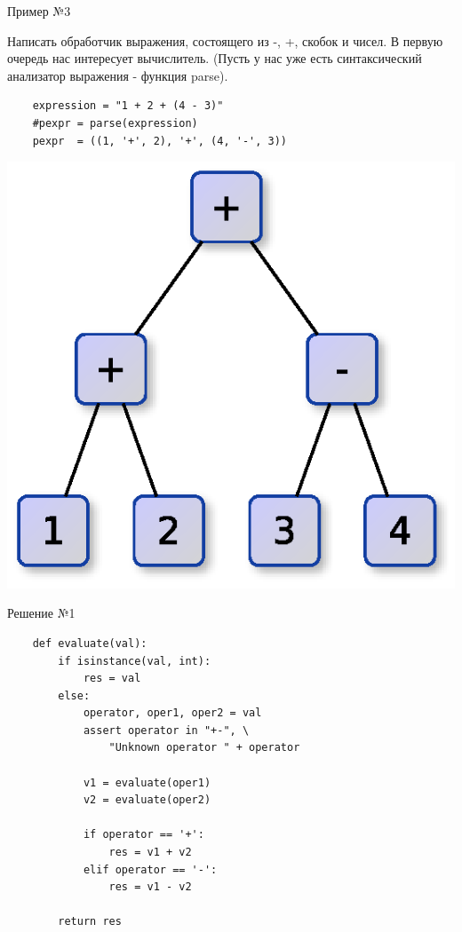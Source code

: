 \documentclass{article}
\begin{document}
\begin{center} Пример №3 \end{center}
    Написать обработчик выражения, состоящего из -, +, скобок и чисел.
    В первую очередь нас интересует вычислитель.
    (Пусть у нас уже есть синтаксический анализатор выражения - функция parse).
\begin{lstlisting}
    expression = "1 + 2 + (4 - 3)"
    #pexpr = parse(expression)
    pexpr  = ((1, '+', 2), '+', (4, '-', 3))
\end{lstlisting}
    \begin{center} \includegraphics{images/parse_tree.eps} \end{center}     
\newpage

\begin{center} Решение №1 \end{center}
\begin{lstlisting}
    def evaluate(val):
        if isinstance(val, int):
            res = val
        else:
            operator, oper1, oper2 = val
            assert operator in "+-", \
                "Unknown operator " + operator

            v1 = evaluate(oper1)
            v2 = evaluate(oper2)

            if operator == '+':
                res = v1 + v2
            elif operator == '-':
                res = v1 - v2

        return res
\end{lstlisting}
\newpage
\end{document}
